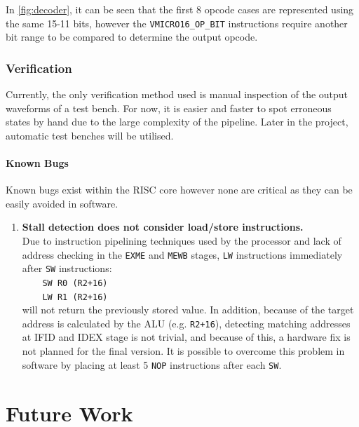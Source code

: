 In \cref{fig:decoder}, it can be seen that the first 8 opcode cases are represented using the same 15-11 bits, however the \verb|VMICRO16_OP_BIT| instructions require another bit range to be compared to determine the output opcode.

\subsection{Verification}
Currently, the only verification method used is manual inspection of the output waveforms of a test bench. For now, it is easier and faster to spot erroneous states by hand due to the large complexity of the pipeline. Later in the project, automatic test benches will be utilised. 

\subsubsection{Known Bugs}
Known bugs exist within the RISC core however none are critical as they can be easily avoided in software.

\begin{enumerate}[leftmargin=3\parindent, label=\bfseries BUG\arabic*, style=nextline]
\item{\textbf{Stall detection does not consider load/store instructions.}\\
Due to instruction pipelining techniques used by the processor and lack of address checking in the \verb|EXME| and \verb|MEWB| stages, \verb|LW| instructions immediately after \verb|SW| instructions:\\ \verb|    SW R0 (R2+16)|\\ \verb|    LW R1 (R2+16)|\\
will not return the previously stored value. In addition, because of the target address is calculated by the ALU (e.g. \verb|R2+16|), detecting matching addresses at IFID and IDEX stage is not trivial, and because of this, a hardware fix is not planned for the final version. It is possible to overcome this problem in software by placing at least 5 \verb|NOP| instructions after each \verb|SW|. 
}\label{bug:swlw}
\end{enumerate}


\chapter{Future Work}

{%
\startcontents[chapters]
}

